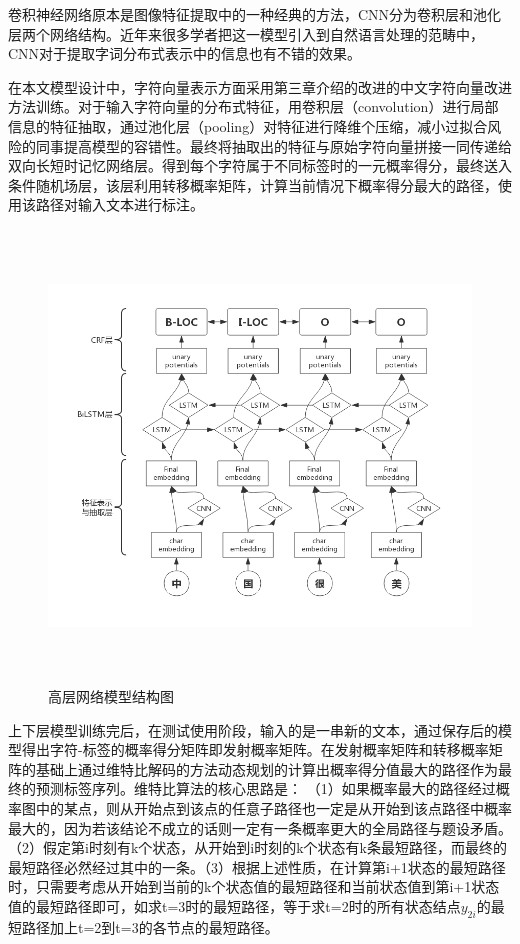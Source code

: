 \documentclass[winfonts,master,oneside,nobackinfo]{njuthesis}
\begin{document}
卷积神经网络原本是图像特征提取中的一种经典的方法，CNN分为卷积层和池化层两个网络结构。近年来很多学者把这一模型引入到自然语言处理的范畴中，CNN对于提取字词分布式表示中的信息也有不错的效果。

在本文模型设计中，字符向量表示方面采用第三章介绍的改进的中文字符向量改进方法训练。对于输入字符向量的分布式特征，用卷积层（convolution）进行局部信息的特征抽取，通过池化层（pooling）对特征进行降维个压缩，减小过拟合风险的同事提高模型的容错性。最终将抽取出的特征与原始字符向量拼接一同传递给双向长短时记忆网络层。得到每个字符属于不同标签时的一元概率得分，最终送入条件随机场层，该层利用转移概率矩阵，计算当前情况下概率得分最大的路径，使用该路径对输入文本进行标注。



\begin{figure}[H]
\centering
\begin{minipage}[t]{\textwidth}
\includegraphics[width=1\textwidth,height=12cm]{./figure/CNN辅助.jpg}
\caption{高层网络模型结构图}
\label{lab:1}
\end{minipage}
\end{figure}

上下层模型训练完后，在测试使用阶段，输入的是一串新的文本，通过保存后的模型得出字符-标签的概率得分矩阵即发射概率矩阵。在发射概率矩阵和转移概率矩阵的基础上通过维特比解码的方法动态规划的计算出概率得分值最大的路径作为最终的预测标签序列。维特比算法的核心思路是： （1）如果概率最大的路径经过概率图中的某点，则从开始点到该点的任意子路径也一定是从开始到该点路径中概率最大的，因为若该结论不成立的话则一定有一条概率更大的全局路径与题设矛盾。（2）假定第i时刻有k个状态，从开始到i时刻的k个状态有k条最短路径，而最终的最短路径必然经过其中的一条。（3）根据上述性质，在计算第i+1状态的最短路径时，只需要考虑从开始到当前的k个状态值的最短路径和当前状态值到第i+1状态值的最短路径即可，如求t=3时的最短路径，等于求t=2时的所有状态结点$y_{2i}$的最短路径加上t=2到t=3的各节点的最短路径。
\end{document}
